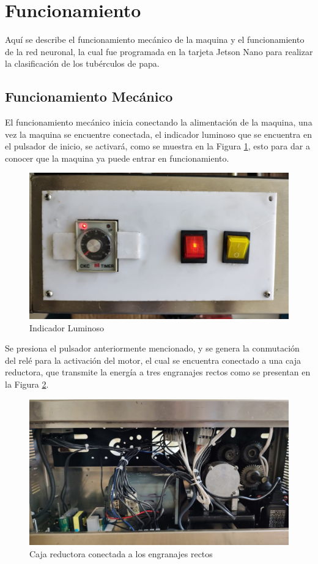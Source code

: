 	\section{Funcionamiento}
	Aquí se describe el funcionamiento mecánico de la maquina y el funcionamiento de la red neuronal, la cual fue programada en la tarjeta Jetson Nano para realizar la clasificación de los tubérculos de papa.
	
	\subsection{Funcionamiento Mecánico}
		El funcionamiento mecánico inicia conectando la alimentación de la maquina, una vez la maquina se encuentre conectada, el indicador luminoso que se encuentra en el pulsador de inicio, se activará, como se muestra en la Figura \ref{fig:indicador}, esto para dar a conocer que la maquina ya puede entrar en funcionamiento.
		
		\begin{figure}[ht]
			\centering
			\includegraphics[angle=270, scale=0.21]{Figs/200.jpg}
			\caption{Indicador Luminoso}
			\label{fig:indicador}
		\end{figure}
		
		 Se presiona el pulsador anteriormente mencionado, y se genera la conmutación del relé para la activación del motor, el cual se encuentra conectado a una caja reductora, que transmite la energía a tres engranajes rectos como se presentan en la Figura \ref{fig:caja}.
		 
		 \newpage		 
		 \begin{figure}[ht]
		 	\centering
		 	\includegraphics[scale=0.13]{Figs/201.jpg}
		 	\caption{Caja reductora conectada a los engranajes rectos}
		 	\label{fig:caja}
		 \end{figure}
		 
